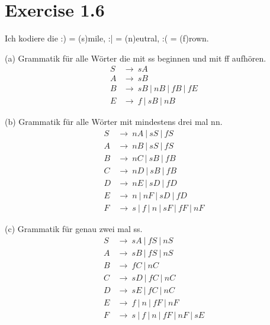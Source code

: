 \documentclass{article}
\begin{document}
\section*{Exercise 1.6}

Ich kodiere die  :) = (s)mile, :| = (n)eutral, :( = (f)rown.

\noindent (a) Grammatik f\"ur alle W\"orter die mit ss beginnen und mit ff aufh\"oren.
\begin{align*}
S &\rightarrow\ sA\\
A &\rightarrow\ sB\\
B &\rightarrow\ sB\ |\ nB\ |\ fB\ |\ fE\\  %
E &\rightarrow\ f\ |\ sB\ |\ nB
\end{align*}

\noindent (b) Grammatik f\"ur alle W\"orter mit mindestens drei mal nn.
\begin{align*}
S &\rightarrow\ nA\ |\ sS\ |\ fS\\
A &\rightarrow\ nB\ |\ sS\ |\ fS\\
B &\rightarrow\ nC\ |\ sB\ |\ fB\\
C &\rightarrow\ nD\ |\ sB\ |\ fB\\
D &\rightarrow\ nE\ |\ sD\ |\ fD\\
E &\rightarrow\ n\ |\ nF\ |\ sD\ |\ fD\\
F &\rightarrow\ s\ |\ f\ |\ n\ |\ sF\ |\ fF\ |\ nF
\end{align*}

\noindent (c) Grammatik f\"ur genau zwei mal ss.
\begin{align*}
S &\rightarrow\ sA\ |\ fS\ |\ nS\\
A &\rightarrow\ sB\ |\ fS\ |\ nS\\
B &\rightarrow\ fC\ |\ nC\\
C &\rightarrow\ sD\ |\ fC\ |\ nC\\
D &\rightarrow\ sE\ |\ fC\ |\ nC\\
E &\rightarrow\ f\ |\ n\ |\ fF\ |\ nF\\
F &\rightarrow\ s\ |\ f\ |\ n\ |\ fF\ |\ nF\ |\ sE
\end{align*}

\end{document}
